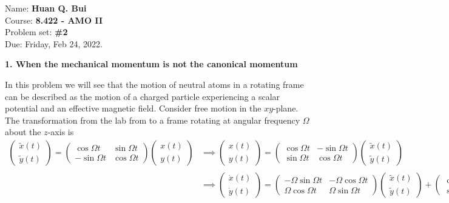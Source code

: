 \documentclass{article}
\theoremstyle{definition}
\begin{document}
\begin{framed}
\noindent Name: \textbf{Huan Q. Bui}\\
Course: \textbf{8.422 - AMO II}\\
Problem set: \textbf{\#2}\\
Due: Friday, Feb 24, 2022.
\end{framed}
	
	




\noindent \textbf{1. When the mechanical momentum is not the canonical momentum}

\noindent In this problem we will see that the motion of neutral atoms in a rotating frame can be described as the motion of a charged particle experiencing a scalar potential and an effective magnetic field. Consider free motion in the $xy$-plane. The transformation from the lab from to a frame rotating at angular frequency $\Omega$ about the $z$-axis is 
\begin{align*}
	\begin{pmatrix}
		\tilde{x}(t) \\  \tilde{y}(t)
	\end{pmatrix}
	= 
	\begin{pmatrix}
		\cos \Omega t  & \sin\Omega t \\ -\sin\Omega t & \cos\Omega t 
	\end{pmatrix}
	\begin{pmatrix}
		x(t) \\ y(t)
	\end{pmatrix}
	&\implies 
	\begin{pmatrix}
		{x}(t) \\  {y}(t)
	\end{pmatrix}
	= 
	\begin{pmatrix}
		\cos \Omega t  & -\sin\Omega t \\ \sin\Omega t & \cos\Omega t 
	\end{pmatrix}
	\begin{pmatrix}
		\tilde{x}(t) \\ \tilde{y}(t)
	\end{pmatrix} \\
	& \implies
	\begin{pmatrix}
		\dot{x}(t) \\  \dot{y}(t)
	\end{pmatrix}
	= 
	\begin{pmatrix}
		-\Omega \sin \Omega t  & -\Omega \cos\Omega t \\ \Omega \cos\Omega t & \Omega \sin\Omega t 
	\end{pmatrix} \begin{pmatrix}
	\tilde{x}(t) \\ \tilde{y}(t)
\end{pmatrix}
	+ 
	\begin{pmatrix}
	\cos \Omega t  & -\sin\Omega t \\ \sin\Omega t & \cos\Omega t 
	\end{pmatrix}
	\begin{pmatrix}
	\dot{\tilde{x}}(t) \\ \dot{\tilde{y}}(t)
	\end{pmatrix}
\end{align*}
\end{document}
